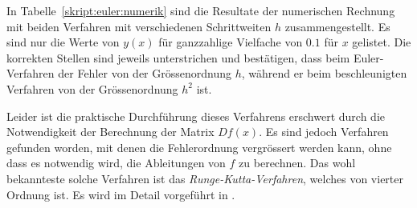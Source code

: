In Tabelle~\ref{skript:euler:numerik} sind die Resultate der numerischen
Rechnung mit beiden Verfahren mit verschiedenen Schrittweiten $h$
zusammengestellt.
Es sind nur die Werte von $y(x)$ für ganzzahlige Vielfache von $0.1$
für $x$ gelistet.
Die korrekten Stellen sind jeweils unterstrichen und bestätigen, dass
beim Euler-Verfahren der Fehler von der Grössenordnung $h$, während
er beim beschleunigten Verfahren von der Grössenordnung $h^2$ ist.

Leider ist die praktische Durchführung dieses Verfahrens erschwert durch
die Notwendigkeit der Berechnung der Matrix $Df(x)$.
Es sind jedoch Verfahren gefunden worden, mit denen die Fehlerordnung
vergrössert werden kann, ohne dass es notwendig wird, die Ableitungen
von $f$ zu berechnen.
Das wohl bekannteste solche Verfahren ist das {\em Runge-Kutta-Verfahren},
welches von vierter Ordnung ist.
Es wird im Detail vorgeführt in \cite{skript:mathsem-dgl}.



